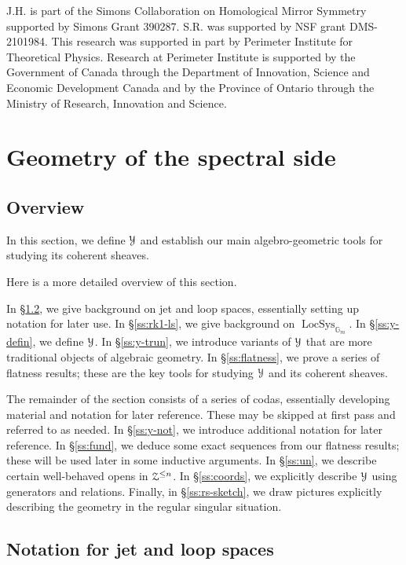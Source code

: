 \documentclass[reqno,11pt]{amsart}
\numberwithin{equation}{subsection}
\theoremstyle{remark}
\newcommand{\bG}{{\mathbb G}}
\newcommand{\sY}{{\EuScript Y}}
\newcommand{\sZ}{{\EuScript Z}}
\newcommand{\on}{\operatorname}
\newcommand{\LocSys}{\on{LocSys}}
\begin{document}
J.H. is part of the Simons Collaboration on Homological Mirror Symmetry supported by 
Simons Grant 390287. S.R. was supported by NSF grant DMS-2101984.
This research was supported in part by Perimeter Institute for Theoretical Physics. 
Research at Perimeter Institute is supported by the Government of Canada through the 
Department of Innovation, Science and Economic Development Canada and by the Province of 
Ontario through the Ministry of Research, Innovation and Science.

\section{Geometry of the spectral side}\label{s:spectral}

\subsection{Overview}

In this section, we define $\sY$ and establish our main algebro-geometric tools
for studying its coherent sheaves.

Here is a more detailed overview of this section. 

In \S \ref{ss:jet-notation}, we give background on jet and loop spaces,
essentially setting up notation for later use.
In \S \ref{ss:rk1-ls}, we give background on $\LocSys_{\bG_m}$.
In \S \ref{ss:y-defin}, we define $\sY$. In \S \ref{ss:y-trun},
we introduce variants of $\sY$ that are more traditional objects
of algebraic geometry. In \S \ref{ss:flatness}, we prove a series 
of flatness results; these are the key tools for studying $\sY$ and
its coherent sheaves. 

The remainder of the section consists of a series of codas, essentially 
developing material and notation for later reference. These may be skipped
at first pass and referred to as needed. In \S \ref{ss:y-not}, we introduce
additional notation for later reference. In \S \ref{ss:fund}, we deduce
some exact sequences from our flatness results; these will be used
later in some inductive arguments. In \S \ref{ss:un}, we describe
certain well-behaved opens in $\sZ^{\leq n}$. 
In \S \ref{ss:coords}, we explicitly describe $\sY$ using
generators and relations. Finally, in \S \ref{ss:rs-sketch}, we draw pictures
explicitly describing the geometry in the regular singular situation.

\subsection{Notation for jet and loop spaces}\label{ss:jet-notation}
\end{document}
